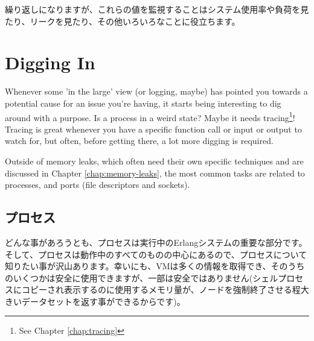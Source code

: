繰り返しになりますが、これらの値を監視することはシステム使用率や負荷を見たり、リークを見たり、その他いろいろなことに役立ちます。

\section{Digging In}
\label{sec:digging-in}

Whenever some 'in the large' view (or logging, maybe) has pointed you towards a potential cause for an issue you're having, it starts being interesting to dig around with a purpose. Is a process in a weird state? Maybe it needs tracing\footnote{See Chapter \ref{chap:tracing}}! Tracing is great whenever you have a specific function call or input or output to watch for, but often, before getting there, a lot more digging is required.

Outside of memory leaks, which often need their own specific techniques and are discussed in Chapter \ref{chap:memory-leaks}, the most common tasks are related to processes, and ports (file descriptors and sockets).

\subsection{プロセス}
\label{subsec:digging-procs}

どんな事があろうとも、プロセスは実行中のErlangシステムの重要な部分です。そして、プロセスは動作中のすべてのものの中心にあるので、プロセスについて知りたい事が沢山あります。幸いにも、VMは多くの情報を取得でき、そのうちのいくつかは安全に使用できますが、一部は安全ではありません(シェルプロセスにコピーされ表示するのに使用するメモリ量が、ノードを強制終了させる程大きいデータセットを返す事ができるからです)。

